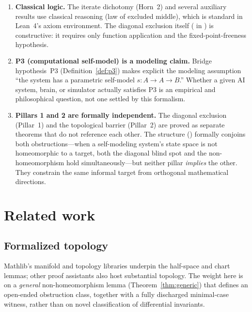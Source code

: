 \documentclass[11pt]{article}
\begin{document}
\begin{enumerate}
\item \textbf{Classical logic.}  The iterate dichotomy (Horn~2) and
  several auxiliary results use classical reasoning (law of excluded
  middle), which is standard in Lean~4's axiom environment.  The
  diagonal exclusion itself
  ( in
  ) is constructive: it requires only
  function application and the fixed-point-freeness hypothesis.

\item \textbf{P3 (computational self-model) is a modeling claim.}
  Bridge hypothesis~P3 (Definition~\ref{def:p3}) makes explicit
  the modeling assumption ``the system has a parametric self-model
  $s : A \to A \to B$.''  Whether a given AI system, brain, or
  simulator actually satisfies P3 is an empirical and
  philosophical question, not one settled by this formalism.

\item \textbf{Pillars 1 and 2 are formally independent.}  The
  diagonal exclusion (Pillar~1) and the topological barrier (Pillar~2)
  are proved as separate theorems that do not reference each other.
  The  structure
  () formally conjoins both
  obstructions---when a self-modeling system's state space is not
  homeomorphic to a target, both the diagonal blind spot and the
  non-homeomorphism hold simultaneously---but neither pillar
  \emph{implies} the other.  They constrain the same informal target
  from orthogonal mathematical directions.
\end{enumerate}

\section{Related work}
\label{sec:related}

\subsection{Formalized topology}
Mathlib's manifold and topology libraries underpin the half-space and chart
lemmas; other proof assistants also host substantial topology.  The weight
here is on a \emph{general} non-homeomorphism lemma (Theorem~\ref{thm:generic})
that defines an open-ended obstruction class, together with a fully discharged
minimal-case witness, rather than on novel classification of differential
invariants.
\end{document}
